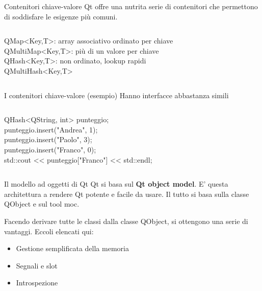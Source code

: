 \documentclass[10pt, aspectratio=169]{beamer}
\begin{document}
\begin{frame}{Contenitori chiave-valore}
	Qt offre una nutrita serie di contenitori che permettono di soddisfare le esigenze più comuni.
	\bigskip
	\begin{columns}
		\begin{block}{}
			{\ttfamily QMap<Key,T>}: array associativo ordinato per chiave\\
			{\ttfamily QMultiMap<Key,T>}: più di un valore per chiave\\
			{\ttfamily QHash<Key,T>}: non ordinato, lookup rapidi\\
			{\ttfamily QMultiHash<Key,T>}
		\end{block}
	\end{columns}
\end{frame}

\begin{frame}{I contenitori chiave-valore (esempio)}
Hanno interfacce abbastanza simili
\bigskip
\begin{columns}
	\column{0.75\textwidth}
	\begin{block}{}
		{\ttfamily QHash<QString, int> punteggio;\\
			punteggio.insert("Andrea", 1);\\
			punteggio.insert("Paolo", 3);\\
			punteggio.insert("Franco", 0);\\
			std::cout << punteggio["Franco"] << std::endl;}
	\end{block}
\end{columns}
\end{frame}

\begin{frame}{Il modello ad oggetti di Qt}
	Qt si basa sul \textbf{Qt object model}. E' questa architettura a rendere Qt potente e facile da usare. Il tutto si basa sulla classe {\ttfamily QObject} e sul tool {\ttfamily moc}.
	
	Facendo derivare tutte le classi dalla classe {\ttfamily QObject}, si ottengono una serie di vantaggi. Eccoli elencati qui:
	
	\begin{itemize}
		\item Gestione semplificata della memoria
		\item Segnali e slot
		\item Introspezione
	\end{itemize}
\end{frame}
\end{document}
